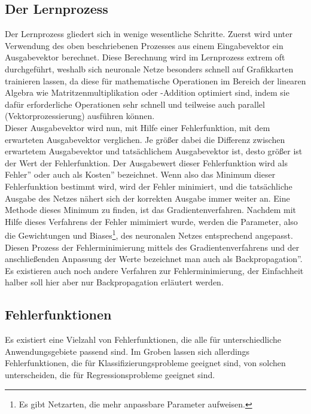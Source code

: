 \documentclass[11pt]{article}
\begin{document}
\subsection{Der Lernprozess}
Der Lernprozess gliedert sich in wenige wesentliche Schritte. Zuerst wird unter Verwendung des oben beschriebenen Prozesses aus einem Eingabevektor ein Ausgabevektor berechnet. Diese Berechnung wird im Lernprozess extrem oft durchgeführt, weshalb sich neuronale Netze besonders schnell auf Grafikkarten trainieren lassen, da diese für mathematische Operationen im Bereich der linearen Algebra wie Matritzenmultiplikation oder -Addition optimiert sind, indem sie dafür erforderliche Operationen sehr schnell und teilweise auch parallel (Vektorprozessierung) ausführen können.\\
Dieser Ausgabevektor wird nun, mit Hilfe einer Fehlerfunktion, mit dem erwarteten Ausgabevektor verglichen. Je größer dabei die Differenz zwischen erwartetem Ausgabevektor und tatsächlichem Ausgabevektor ist, desto größer ist der Wert der Fehlerfunktion. Der Ausgabewert dieser Fehlerfunktion wird als \glqq Fehler'' oder auch als \glqq Kosten'' bezeichnet. Wenn also das Minimum dieser Fehlerfunktion bestimmt wird, wird der Fehler minimiert, und die tatsächliche Ausgabe des Netzes nähert sich der korrekten Ausgabe immer weiter an.\newline
Eine Methode dieses Minimum zu finden, ist das Gradientenverfahren. Nachdem mit Hilfe dieses Verfahrens der Fehler mimimiert wurde, werden die Parameter, also die Gewichtungen und Biases\footnote{Es gibt Netzarten, die mehr anpassbare Parameter aufweisen.}, des neuronalen Netzes entsprechend angepasst. Diesen Prozess der Fehlerminimierung mittels des Gradientenverfahrens und der anschließenden Anpassung der Werte bezeichnet man auch als \glqq Backpropagation''. Es existieren auch noch andere Verfahren zur Fehlerminimierung, der Einfachheit halber soll hier aber nur Backpropagation erläutert werden.
\subsection{Fehlerfunktionen}
Es existiert eine Vielzahl von Fehlerfunktionen, die alle für unterschiedliche Anwendungsgebiete passend sind. Im Groben lassen sich allerdings Fehlerfunktionen, die für Klassifizierungsprobleme geeignet sind, von solchen unterscheiden, die für Regressionsprobleme geeignet sind.
\end{document}
